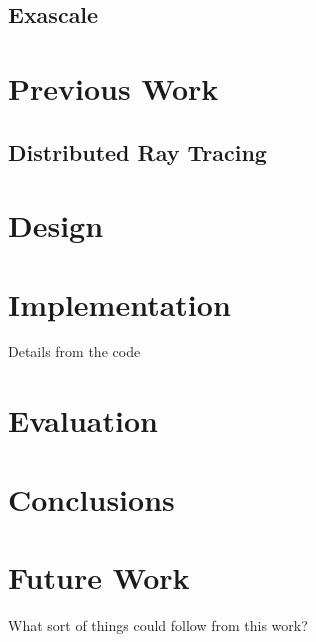 \documentclass[MSc,12pt]{wsuthesis}
\begin{document}
  \section{Exascale}
    
    

\chapter{Previous Work}
  \section{Distributed Ray Tracing}
  

\chapter{Design}
  

\chapter{Implementation}
  Details from the code
  
\chapter{Evaluation}
  

\chapter{Conclusions}
  

\chapter{Future Work}
  What sort of things could follow from this work?

\newpage
\singlespacing



\appendix
% 
\end{document}
